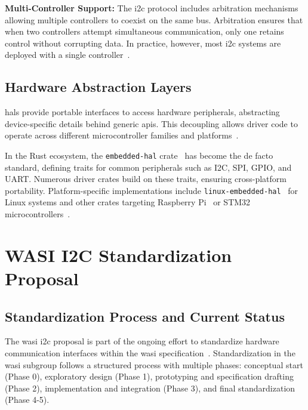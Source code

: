 \textbf{Multi-Controller Support:} The \acrshort{i2c} protocol includes arbitration mechanisms allowing multiple controllers to coexist on the same bus. Arbitration ensures that when two controllers attempt simultaneous communication, only one retains control without corrupting data. In practice, however, most \acrshort{i2c} systems are deployed with a single controller~\cite{i2c_specification}.

\subsection{Hardware Abstraction Layers}
\label{subsec:hal-embedded}

\acrfull{hal}s provide portable interfaces to access hardware peripherals, abstracting device-specific details behind generic \acrshort{api}s. This decoupling allows driver code to operate across different microcontroller families and platforms~\cite{hal}.  

In the Rust ecosystem, the \texttt{embedded-hal} crate~\cite{embedded_hal_crate} has become the de facto standard, defining traits for common peripherals such as I2C, SPI, GPIO, and UART. Numerous driver crates build on these traits, ensuring cross-platform portability. Platform-specific implementations include \texttt{linux-embedded-hal}~\cite{linux_embedded_hal_crate} for Linux systems and other crates targeting Raspberry Pi~\cite{rppal_crate} or STM32 microcontrollers~\cite{stm_hal_crate}.

\section{WASI I2C Standardization Proposal}
\label{sec:wasi-i2c-proposal}

\subsection{Standardization Process and Current Status}
\label{subsec:i2c-standardization-process}

The \acrshort{wasi} \acrshort{i2c} proposal is part of the ongoing effort to standardize hardware communication interfaces within the \acrshort{wasi} specification~\cite{wasi_i2c_proposal}. Standardization in the \acrshort{wasi} subgroup follows a structured process with multiple phases: conceptual start (Phase 0), exploratory design (Phase 1), prototyping and specification drafting (Phase 2), implementation and integration (Phase 3), and final standardization (Phase 4-5).  

